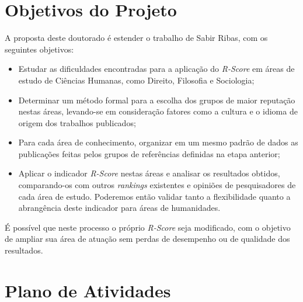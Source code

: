 \documentclass[a4paper,12pt,titlepage]{article}
\begin{document}
\section{Objetivos do Projeto} 
A proposta deste doutorado é estender o trabalho de Sabir Ribas, com os seguintes objetivos:

\begin{itemize}
\item Estudar as dificuldades encontradas para a aplicação do \textit{R-Score} em áreas de estudo de Ciências Humanas, como Direito, Filosofia e Sociologia;
\item Determinar um método formal para a escolha dos grupos de maior reputação nestas áreas, levando-se em consideração fatores como a cultura e o idioma de origem dos trabalhos publicados;
\item Para cada área de conhecimento, organizar em um mesmo padrão de dados as publicações feitas pelos grupos de referências definidas na etapa anterior;
\item Aplicar o indicador \textit{R-Score} nestas áreas e analisar os resultados obtidos, comparando-os com outros \textit{rankings} existentes e opiniões de pesquisadores de cada área de estudo. Poderemos então validar tanto a flexibilidade quanto a abrangência deste indicador para áreas de humanidades.
\end{itemize}

É possível que neste processo o próprio \textit{R-Score} seja modificado, com o objetivo de ampliar sua área de atuação sem perdas de desempenho ou de qualidade dos resultados. 

\section{Plano de Atividades} 
\end{document}
